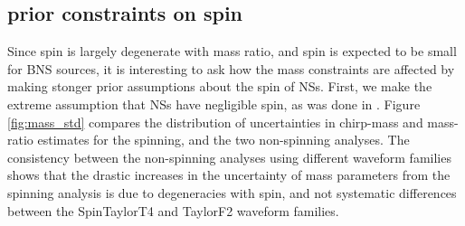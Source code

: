 \subsection{prior constraints on spin}
\label{subsec:prior_constraints}

Since spin is largely degenerate with mass ratio, and spin is expected to be small for BNS sources, it is interesting to ask how the mass constraints are affected by making stonger prior assumptions about the spin of NSs.  First, we make the extreme assumption that NSs have negligible spin, as was done in \citet{Singer_2014}.  Figure \ref{fig:mass_std} compares the distribution of uncertainties in chirp-mass and mass-ratio estimates for the spinning, and the two non-spinning analyses.  The consistency between the non-spinning analyses using different waveform families shows that the drastic increases in the uncertainty of mass parameters from the spinning analysis is due to degeneracies with spin, and not systematic differences between the SpinTaylorT4 and TaylorF2 waveform families.